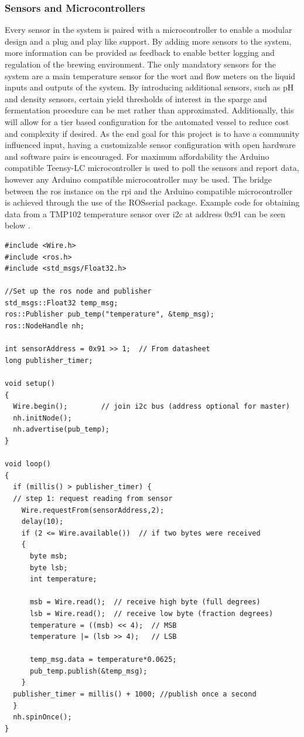 \documentclass{article}
\begin{document}
\subsubsection{Sensors and Microcontrollers}\label{subsec:sensor}
Every sensor in the system is paired with a microcontroller to enable a modular design and a plug and play like support.  By adding more sensors to the system, more information can be provided as feedback to enable better logging and regulation of the brewing environment.  The only mandatory sensors for the system are a main temperature sensor for the \gls{wort} and flow meters on the liquid inputs and outputs of the system.  By introducing additional sensors, such as pH and density sensors, certain yield thresholds of interest in the \gls{sparge} and fermentation procedure can be met rather than approximated.  Additionally, this will allow for a tier based configuration for the automated vessel to reduce cost and complexity if desired.  As the end goal for this project is to have a community influenced input, having a customizable sensor configuration with open hardware and software pairs is encouraged.  For maximum affordability the Arduino compatible Teensy-LC microcontroller is used to poll the sensors and report data, however any Arduino compatible microcontroller may be used. The bridge between the \gls{ros} instance on the \gls{rpi} and the Arduino compatible microcontroller is achieved through the use of the ROSserial package.  Example code for obtaining data from a TMP102 temperature sensor over \gls{i2c} at address 0x91 \cite{tmp102} can be seen below \cite{rosserial}.

\begin{lstlisting}
#include <Wire.h>
#include <ros.h>
#include <std_msgs/Float32.h>

//Set up the ros node and publisher
std_msgs::Float32 temp_msg;
ros::Publisher pub_temp("temperature", &temp_msg);
ros::NodeHandle nh;

int sensorAddress = 0x91 >> 1;  // From datasheet
long publisher_timer;

void setup()
{
  Wire.begin();        // join i2c bus (address optional for master)
  nh.initNode();
  nh.advertise(pub_temp);
}

void loop()
{
  if (millis() > publisher_timer) {
  // step 1: request reading from sensor
    Wire.requestFrom(sensorAddress,2);
    delay(10);
    if (2 <= Wire.available())  // if two bytes were received
    {
      byte msb;
      byte lsb;
      int temperature;

      msb = Wire.read();  // receive high byte (full degrees)
      lsb = Wire.read();  // receive low byte (fraction degrees)
      temperature = ((msb) << 4);  // MSB
      temperature |= (lsb >> 4);   // LSB

      temp_msg.data = temperature*0.0625;
      pub_temp.publish(&temp_msg);
    }
  publisher_timer = millis() + 1000; //publish once a second
  }
  nh.spinOnce();
}
\end{lstlisting}
\end{document}
